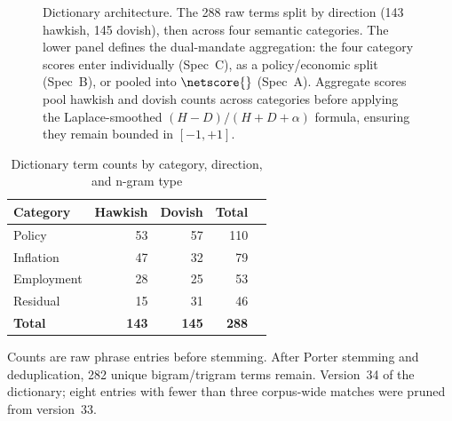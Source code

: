 \begin{figure}[htbp]
\caption[Dictionary architecture]{Dictionary architecture. The 288
raw terms split by direction (143 hawkish, 145 dovish), then
across four semantic categories. The lower panel defines the
dual-mandate aggregation: the four category scores enter
individually (Spec~C), as a policy/economic split (Spec~B), or
pooled into $\netscore{}$ (Spec~A). Aggregate scores pool hawkish
and dovish counts across categories before applying the Laplace-smoothed
$(H{-}D)/(H{+}D{+}\alpha)$ formula, ensuring they remain bounded in
$[-1,+1]$.}
\label{fig:dict_arch}
\end{figure}

\begin{table}[htbp]
\centering
\caption{Dictionary term counts by category, direction, and n-gram type}
\label{tab:dict_counts}
\begin{threeparttable}
\begin{tabular}{lrrrr}
\toprule
Category    & Hawkish & Dovish & Total \\
\midrule
Policy      & 53  & 57 & 110 \\
Inflation   & 47  & 32 & 79  \\
Employment  & 28  & 25 & 53  \\
Residual    & 15  & 31 & 46  \\
\midrule
\textbf{Total} & \textbf{143} & \textbf{145} & \textbf{288} \\
\bottomrule
\end{tabular}
\begin{tablenotes}\footnotesize
  \item[] Counts are raw phrase entries before stemming. After
    Porter stemming and deduplication, 282 unique bigram/trigram
    terms remain. Version~34 of the dictionary; eight entries with
    fewer than three corpus-wide matches were pruned from
    version~33.
\end{tablenotes}
\end{threeparttable}
\end{table}

